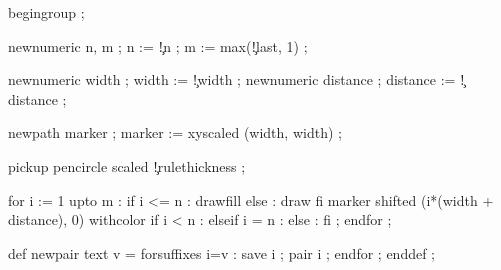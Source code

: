 


  begingroup ;

  newnumeric n, m ;
  n := \visualcounterparameter\c!n ;
  m := max(\visualcounterparameter\c!last, 1) ;

  newnumeric width    ; width    := \visualcounterparameter\c!width    ;
  newnumeric distance ; distance := \visualcounterparameter\c!distance ;

  newpath marker ;
  marker :=  %
            xyscaled (width, width) ;

  pickup pencircle scaled \visualcounterparameter\c!rulethickness ;

  for i := 1 upto m :
    if i <= n : drawfill
    else      : draw
    fi
      marker shifted (i*(width + distance), 0) withcolor
          if i < n     :  
          elseif i = n : 
          else         : 
          fi ;
  endfor ;
\stopuseMPgraphic




\startMPdefinitions
  def newpair    text v = forsuffixes i=v : save i ; pair    i ; endfor ; enddef ;
\stopMPdefinitions

